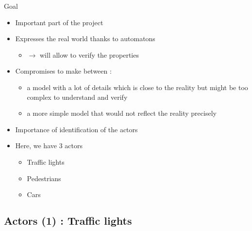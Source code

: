 \documentclass{bredelebeamer}
\begin{document}
\begin{frame}{Goal}


\begin{itemize}

\item Important part of the project

\item Expresses the real world thanks to automatons
\begin{itemize}
\item $\longrightarrow$ will allow to verify the properties
\end{itemize}

\item Compromises to make between :
\begin{itemize}
\item a model with a lot of details which is close to the reality but might be too complex to understand and verify
\item a more simple model that would not reflect the reality precisely
\end{itemize}

\item Importance of identification of the actors

\item Here, we have 3 actors
\begin{itemize}
\item Traffic lights
\item Pedestrians
\item Cars
\end{itemize}

\end{itemize}


\end{frame}


\subsection{Actors (1) : Traffic lights}
\end{document}
